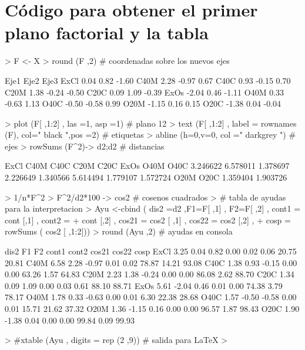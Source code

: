 \documentclass{article}
\begin{document}
\section{Código para obtener el primer plano factorial y la tabla}

\begin{Schunk}
\begin{Sinput}
> F <- X %*% U; 
> round (F ,2) # coordenadas sobre los nuevos ejes
\end{Sinput}
\begin{Soutput}
      Eje1   Eje2   Eje3 
ExCl   0.04   0.82  -1.60
C40M   2.28  -0.97   0.67
C40C   0.93  -0.15   0.70
C20M   1.38  -0.24  -0.50
C20C   0.09   1.09  -0.39
ExOs  -2.04   0.46  -1.11
O40M   0.33  -0.63   1.13
O40C  -0.50  -0.58   0.99
O20M  -1.15   0.16   0.15
O20C  -1.38   0.04  -0.04
\end{Soutput}
\begin{Sinput}
> plot (F[ ,1:2] , las =1, asp =1) # plano 12
> text (F[ ,1:2] , label = rownames (F), col=" black ",pos =2) # etiquetas
> abline (h=0,v=0, col =" darkgrey ") # ejes
> rowSums (F^2)-> d2;d2 # distancias
\end{Sinput}
\begin{Soutput}
    ExCl     C40M     C40C     C20M     C20C     ExOs     O40M     O40C 
3.246622 6.578011 1.378697 2.226649 1.340566 5.614494 1.779107 1.572724 
    O20M     O20C 
1.359404 1.903726 
\end{Soutput}
\begin{Sinput}
> 1/n*F^2 %*%diag (1/ lambda )*100 -> cont # contribuciones
> F^2/d2*100 -> cos2 # cosenos cuadrados
> # tabla de ayudas para la interpretacion
> Ayu <-cbind ( dis2 =d2 ,F1=F[ ,1] , F2=F[ ,2] , cont1 = cont [,1] , cont2 =
+ cont [,2] , cos21 = cos2 [ ,1] , cos22 = cos2 [,2] ,
+ cosp = rowSums ( cos2 [ ,1:2]))
> round (Ayu ,2) # ayudas en consola
\end{Sinput}
\begin{Soutput}
     dis2    F1    F2 cont1 cont2 cos21 cos22  cosp
ExCl 3.25  0.04  0.82  0.00  0.02  0.06 20.75 20.81
C40M 6.58  2.28 -0.97  0.01  0.02 78.87 14.21 93.08
C40C 1.38  0.93 -0.15  0.00  0.00 63.26  1.57 64.83
C20M 2.23  1.38 -0.24  0.00  0.00 86.08  2.62 88.70
C20C 1.34  0.09  1.09  0.00  0.03  0.61 88.10 88.71
ExOs 5.61 -2.04  0.46  0.01  0.00 74.38  3.79 78.17
O40M 1.78  0.33 -0.63  0.00  0.01  6.30 22.38 28.68
O40C 1.57 -0.50 -0.58  0.00  0.01 15.71 21.62 37.32
O20M 1.36 -1.15  0.16  0.00  0.00 96.57  1.87 98.43
O20C 1.90 -1.38  0.04  0.00  0.00 99.84  0.09 99.93
\end{Soutput}
\begin{Sinput}
> #xtable (Ayu , digits = rep (2 ,9)) # salida para LaTeX
> 
\end{Sinput}
\end{Schunk}
\end{document}
